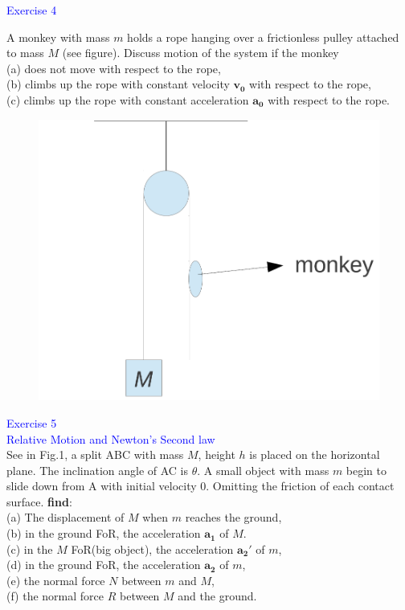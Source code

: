 \documentclass{beamer}
\begin{document}
\begin{frame}
\textcolor{blue}{Exercise 4}

A monkey with mass $m$ holds a rope hanging over a frictionless pulley attached to mass $M$ (see
figure). Discuss motion of the system if the monkey\\
(a) does not move with respect to the rope,\\
(b) climbs up the rope with constant velocity $\mathbf{v_0}$ with respect to the rope,\\
(c) climbs up the rope with constant acceleration $\mathbf{a_0}$ with respect to the rope.
\begin{figure}[htbp]
\centering
\includegraphics[width=0.4 \linewidth, angle =0]{ex4.png}
\label{fig:4}
\end{figure}
\end{frame}

\begin{frame}
\textcolor{blue}{Exercise 5}\\
\textcolor{blue}{\footnotesize{Relative Motion and Newton's Second law}}\\

See in Fig.1, a split ABC with mass $M$, height $h$ is placed on the horizontal plane. The inclination angle of AC is $\theta$. A small object with mass $m$ begin to slide down from A with initial velocity 0. Omitting the friction of each contact surface. \textbf{find}:\\
(a) The displacement of $M$ when $m$ reaches the ground,\\
(b) in the ground FoR, the acceleration $\mathbf{a_1}$ of $M$.\\
(c) in the $M$ FoR(big object), the acceleration $\mathbf{a_2'}$ of $m$,\\
(d) in the ground FoR, the acceleration $\mathbf{a_2}$ of $m$,\\
(e) the normal force $N$ between $m$ and $M$,\\
(f) the normal force $R$ between $M$ and the ground.
\end{frame}
\end{document}

